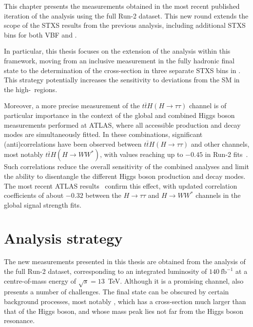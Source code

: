This chapter presents the measurements obtained in the most recent published iteration of the \htautau analysis using the full Run-2 dataset. This new round extends the scope of the STXS results from the previous analysis, including additional STXS bins for both VBF and \ttH.  

In particular, this thesis focuses on the extension of the \ttH analysis within this framework, moving from an inclusive measurement in the fully hadronic final state to the determination of the cross-section in three separate STXS bins in \pth. This strategy potentially increases the sensitivity to deviations from the SM in the high-\pt\ regions.  

Moreover, a more precise measurement of the $t\bar{t}H(H\to\tau\tau)$ channel is of particular importance in the context of the global and combined Higgs boson measurements performed at ATLAS, where all accessible production and decay modes are simultaneously fitted. In these combinations, significant (anti)correlations have been observed between $t\bar{t}H(H\to\tau\tau)$ and other channels, most notably $t\bar{t}H(H\to WW^*)$, with values reaching up to $-0.45$ in Run-2 fits~\cite{Aad_2020_combined}. Such correlations reduce the overall sensitivity of the combined analyses and limit the ability to disentangle the different Higgs boson production and decay modes. The most recent ATLAS results~\cite{Nature_ATLAS} confirm this effect, with updated correlation coefficients of about $-0.32$ between the $H\to\tau\tau$ and $H\to WW^*$ channels in the global signal strength fits.


\section{Analysis strategy}
\label{sec:analysis_strategy}

The new measurements presented in this thesis are obtained from the analysis of the full Run-2 dataset, corresponding to an integrated luminosity of $140~\text{fb}^{-1}$ at a centre-of-mass energy of $\sqrt{s}=13$~TeV. Although it is a promising channel, \htautau also presents a number of challenges. The final state can be obscured by certain background processes, most notably \ztautau, which has a cross-section much larger than that of the Higgs boson, and whose mass peak lies not far from the Higgs boson resonance.  

